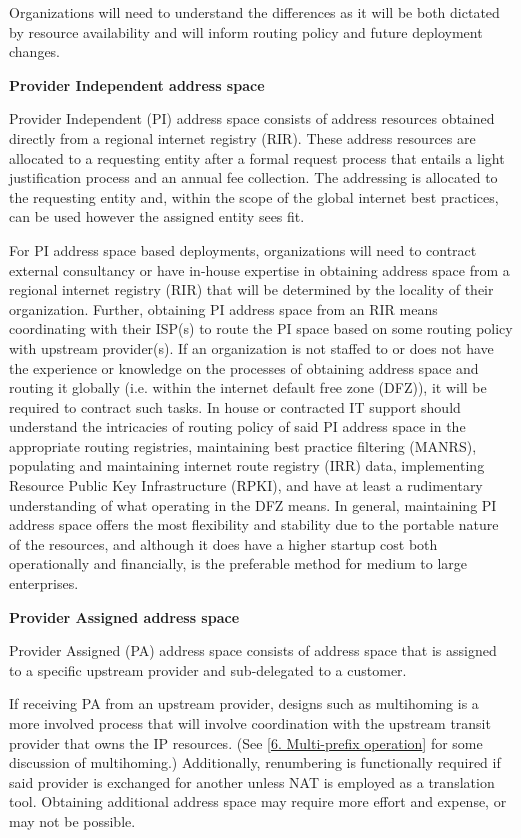 \documentclass[
]{article}
\begin{document}
Organizations will need to understand the differences as it will be both
dictated by resource availability and will inform routing policy and
future deployment changes.

\textbf{Provider Independent address space}

Provider Independent (PI) address space consists of address resources
obtained directly from a regional internet registry (RIR). These address
resources are allocated to a requesting entity after a formal request
process that entails a light justification process and an annual fee
collection. The addressing is allocated to the requesting entity and,
within the scope of the global internet best practices, can be used
however the assigned entity sees fit.

For PI address space based deployments, organizations will need to
contract external consultancy or have in-house expertise in obtaining
address space from a regional internet registry (RIR) that will be
determined by the locality of their organization. Further, obtaining PI
address space from an RIR means coordinating with their ISP(s) to route
the PI space based on some routing policy with upstream provider(s). If
an organization is not staffed to or does not have the experience or
knowledge on the processes of obtaining address space and routing it
globally (i.e. within the internet default free zone (DFZ)), it will be
required to contract such tasks. In house or contracted IT support
should understand the intricacies of routing policy of said PI address
space in the appropriate routing registries, maintaining best practice
filtering (MANRS), populating and maintaining internet route registry
(IRR) data, implementing Resource Public Key Infrastructure (RPKI), and
have at least a rudimentary understanding of what operating in the DFZ
means. In general, maintaining PI address space offers the most
flexibility and stability due to the portable nature of the resources,
and although it does have a higher startup cost both operationally and
financially, is the preferable method for medium to large enterprises.

\textbf{Provider Assigned address space}

Provider Assigned (PA) address space consists of address space that is
assigned to a specific upstream provider and sub-delegated to a
customer.

If receiving PA from an upstream provider, designs such as multihoming
is a more involved process that will involve coordination with the
upstream transit provider that owns the IP resources. (See
{[}\hyperref[multi-prefix-operation]{6. Multi-prefix operation}{]} for
some discussion of multihoming.) Additionally, renumbering is
functionally required if said provider is exchanged for another unless
NAT is employed as a translation tool. Obtaining additional address
space may require more effort and expense, or may not be possible.
\end{document}
